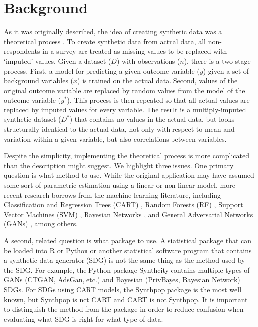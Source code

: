 
\section{Background}\label{sec:background}

As it was originally described, the idea of creating synthetic data was a theoretical process \cite{rubin1993statistical}.  To create synthetic data from actual data, all non-respondents in a survey are treated as missing values to be replaced with `imputed' values.  Given a dataset ($D$) with observations ($n$), there is a two-stage process.  First, a model for predicting a given outcome variable ($y$) given a set of background variables ($x$) is trained on the actual data.  Second, values of the original outcome variable are replaced by random values from the model of the outcome variable ($y^*$).  This process is then repeated so that all actual values are replaced by imputed values for every variable.  The result is a multiply-imputed synthetic dataset ($D^*$) that contains no values in the actual data, but looks structurally identical to the actual data, not only with respect to mean and variation within a given variable, but also correlations between variables.  

Despite the simplicity, implementing the theoretical process is more complicated than the description might suggest.  We highlight three issues.  One primary question is what method to use.  While the original application may have assumed some sort of parametric estimation using a linear or non-linear model, more recent research borrows from the machine learning literature, including Classification and Regression Trees (CART) \cite{reiter2005using}, Random Forests (RF) \cite{caiola2010random}, Support Vector Machines (SVM) \cite{drechsler2010using}, Bayesian Networks \cite{zhang2017privbayes}, and General Adversarial Networks (GANs) \cite{goodfellow2014generative}, among others.  

A second, related question is what package to use.  A statistical package that can be loaded into R or Python or another statistical software program that contains a synthetic data generator (SDG) is not the same thing as the method used by the SDG.  For example, the Python package Synthcity \cite{synthcity} contains multiple types of GANs (CTGAN, AdsGan, etc.) and Bayesian (PrivBayes, Bayesian Network) SDGs.  For SDGs using CART models, the Synthpop package \cite{nowok2016synthpop} is the most well known, but Synthpop is not CART and CART is not Synthpop.  It is important to distinguish the method from the package in order to reduce confusion when evaluating what SDG is right for what type of data.


